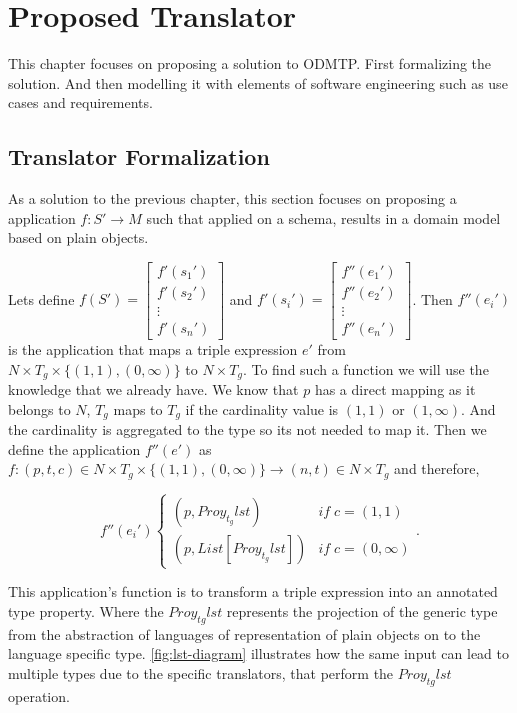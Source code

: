 \chapter{Proposed Translator}
\label{ch:proposed-translator}

This chapter focuses on proposing a solution to ODMTP.
First formalizing the solution. And then modelling it
with elements of software engineering such as use cases
and requirements.

\section{Translator Formalization}
As a solution to the previous chapter, this section focuses on
proposing a application $f : S' \rightarrow M$ such that
applied on a schema, results in a domain model based on
plain objects.

Lets define $f(S') = \begin{bmatrix}f'(s_1')\\ f'(s_2')\\ \vdots\\ f'(s_n')\end{bmatrix}$ and
$f'(s_i') = \begin{bmatrix}f''(e_1')\\ f''(e_2')\\ \vdots\\ f''(e_n')\end{bmatrix}$. Then $f''(e_i')$
is the application that maps a triple expression $e'$ from $N \times T_{g} \times \{(1,1),(0,\infty)\}$
to $N \times T_g$. To find such a function we will use the knowledge that we already have.
We know that $p$ has a direct mapping as it belongs to $N$, $T_g$ maps to $T_g$ if
the cardinality value is $(1,1)$ or $(1, \infty)$. And the cardinality is aggregated to the type
so its not needed to map it. Then we define the application $f''(e')$ as $f:(p,t,c) \in N \times T_g \times \{(1,1), (0,\infty)\} \rightarrow (n,t)\in N \times T_g$
and therefore,

\begin{equation}\label{eq:transformation}
f''(e_i')
\begin{cases}
    (p,Proy_{t_g}lst) & if \; c=(1,1) \\
    (p,List[Proy_{t_g}lst]) & if \; c=(0,\infty)
\end{cases}.
\end{equation}

This application's function is to transform a triple expression
into an annotated type property. Where the $Proy_{tg}lst$ represents
the projection of the generic type from the abstraction of languages
of representation of plain objects on to the language specific type.
\cref{fig:lst-diagram} illustrates how the same input can lead to
multiple types due to the specific translators, that perform the 
$Proy_{tg}lst$ operation.

